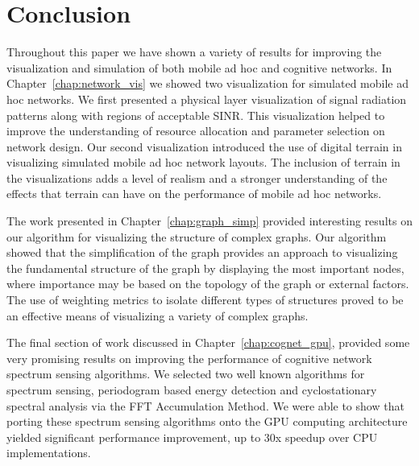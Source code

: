 \chapter{Conclusion}
\label{chap:conclusion}
Throughout this paper we have shown a variety of results for improving the visualization and simulation of both mobile ad hoc and cognitive networks.  In Chapter~\ref{chap:network_vis} we showed two visualization for simulated mobile ad hoc networks.  We first presented a physical layer visualization of signal radiation patterns along with regions of acceptable SINR.  This visualization helped to improve the understanding of resource allocation and parameter selection on network design.  Our second visualization introduced the use of digital terrain in visualizing simulated mobile ad hoc network layouts.  The inclusion of terrain in the visualizations adds a level of realism and a stronger understanding of the effects that terrain can have on the performance of mobile ad hoc networks.

The work presented in Chapter~\ref{chap:graph_simp} provided interesting results on our algorithm for visualizing the structure of complex graphs.  Our algorithm showed that the simplification of the graph provides an approach to visualizing the fundamental structure of the graph by displaying the most important nodes, where importance may be based on the topology of the graph or external factors.  The use of weighting metrics to isolate different types of structures proved to be an effective means of visualizing a variety of complex graphs.

The final section of work discussed in Chapter~\ref{chap:cognet_gpu}, provided some very promising results on improving the performance of cognitive network spectrum sensing algorithms.  We selected two well known algorithms for spectrum sensing, periodogram based energy detection and cyclostationary spectral analysis via the FFT Accumulation Method.  We were able to show that porting these spectrum sensing algorithms onto the GPU computing architecture yielded significant performance improvement, up to 30x speedup over CPU implementations.
